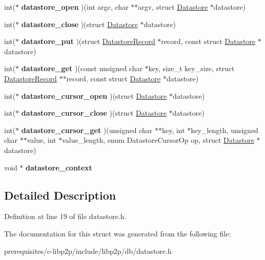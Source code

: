 \begin{DoxyCompactItemize}
int($\ast$ {\bfseries datastore\+\_\+open} )(int argc, char $\ast$$\ast$argv, struct \mbox{\hyperlink{struct_datastore}{Datastore}} $\ast$datastore)
\item 
\mbox{\label{struct_datastore_a909886147d6bfa6fa3874a632d26279c}} 
int($\ast$ {\bfseries datastore\+\_\+close} )(struct \mbox{\hyperlink{struct_datastore}{Datastore}} $\ast$datastore)
\item 
\mbox{\label{struct_datastore_aefcc622e403834824452eb5b9a05a6e8}} 
int($\ast$ {\bfseries datastore\+\_\+put} )(struct \mbox{\hyperlink{struct_datastore_record}{Datastore\+Record}} $\ast$record, const struct \mbox{\hyperlink{struct_datastore}{Datastore}} $\ast$datastore)
\item 
\mbox{\label{struct_datastore_aa4ca171704e6c4f3f7b5a6392f3bfda4}} 
int($\ast$ {\bfseries datastore\+\_\+get} )(const unsigned char $\ast$key, size\+\_\+t key\+\_\+size, struct \mbox{\hyperlink{struct_datastore_record}{Datastore\+Record}} $\ast$$\ast$record, const struct \mbox{\hyperlink{struct_datastore}{Datastore}} $\ast$datastore)
\item 
\mbox{\label{struct_datastore_a59fc812dfd2cfcc32af99c72c9869865}} 
int($\ast$ {\bfseries datastore\+\_\+cursor\+\_\+open} )(struct \mbox{\hyperlink{struct_datastore}{Datastore}} $\ast$datastore)
\item 
\mbox{\label{struct_datastore_a7418be3fa1466010cf927e3c4e69fe02}} 
int($\ast$ {\bfseries datastore\+\_\+cursor\+\_\+close} )(struct \mbox{\hyperlink{struct_datastore}{Datastore}} $\ast$datastore)
\item 
\mbox{\label{struct_datastore_a948d229f49c8a7687a1b2b2f06eb2921}} 
int($\ast$ {\bfseries datastore\+\_\+cursor\+\_\+get} )(unsigned char $\ast$$\ast$key, int $\ast$key\+\_\+length, unsigned char $\ast$$\ast$value, int $\ast$value\+\_\+length, enum Datastore\+Cursor\+Op op, struct \mbox{\hyperlink{struct_datastore}{Datastore}} $\ast$datastore)
\item 
\mbox{\label{struct_datastore_ab3c6964761a2d9b3cde46029be114ab9}} 
void $\ast$ {\bfseries datastore\+\_\+context}
\end{DoxyCompactItemize}


\subsection{Detailed Description}


Definition at line 19 of file datastore.\+h.



The documentation for this struct was generated from the following file\+:\begin{DoxyCompactItemize}
\item 
prerequisites/c-\/libp2p/include/libp2p/db/datastore.\+h\end{DoxyCompactItemize}
